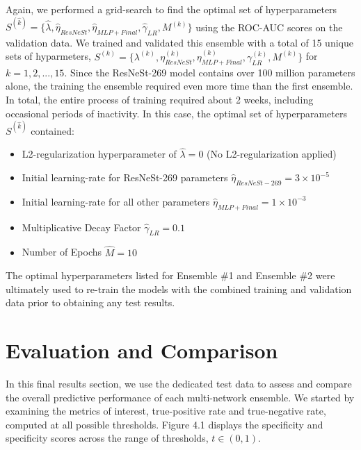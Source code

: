 \documentclass [MAS] {uclathes}
\begin{document}
Again, we performed a grid-search to find the optimal set of hyperparameters $S^{(\hat k)} = \{\hat \lambda, \hat \eta_{ResNeSt}, \hat \eta_{MLP + Final}, \hat \gamma_{LR}, M^{(k)}\}$ using the ROC-AUC scores on the validation data. We trained and validated this ensemble with a total of 15 unique sets of hyparmeters, $S^{(k)} = \{\lambda^{(k)}, \eta_{ResNeSt}^{(k)}, \eta_{MLP+Final}^{(k)}, \gamma_{LR}^{(k)}, M^{(k)}\}$ for $k=1, 2, ..., 15$. Since the ResNeSt-269 model contains over 100 million parameters alone, the training the ensemble required even more time than the first ensemble. In total, the entire process of training required about 2 weeks, including occasional periods of inactivity. In this case, the optimal set of hyperparameters $S^{(\hat k)}$ contained:

\begin{itemize}
    \item L2-regularization hyperparameter of $\hat \lambda = 0$ (No L2-regularization applied)
    \item Initial learning-rate for ResNeSt-269 parameters $\hat \eta_{ResNeSt-269} = 3 \times 10^{-5}$
    \item Initial learning-rate for all other parameters $\hat \eta_{MLP+Final} = 1 \times 10^{-3}$
    \item Multiplicative Decay Factor $\hat \gamma_{LR} = 0.1$
    \item Number of Epochs $\hat M=10$
\end{itemize}

The optimal hyperparameters listed for Ensemble \#1 and Ensemble \#2 were ultimately used to re-train the models with the combined training and validation data prior to obtaining any test results.


\section{Evaluation and Comparison}

In this final results section, we use the dedicated test data to assess and compare the overall predictive performance of each
multi-network ensemble. We started by examining the metrics of interest, true-positive rate and true-negative rate, computed at all possible thresholds. Figure 4.1 displays the specificity and specificity scores across the range of thresholds, $t \in (0, 1)$.
\end{document}
